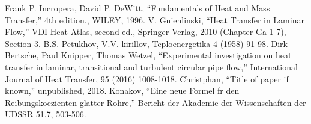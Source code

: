 \documentclass[conference]{IEEEtran}
\begin{document}
\begin{thebibliography}{00}
  Frank P. Incropera, David P. DeWitt, ``Fundamentals of Heat and Mass Transfer,'' 4th edition., WILEY, 1996.
  V. Gnienlinski, ``Heat Transfer in Laminar Flow,'' VDI Heat Atlas, second ed., Springer Verlag, 2010 (Chapter Ga 1-7), Section 3.
  B.S. Petukhov, V.V. kirillov, Teploenergetika 4 (1958) 91-98.
  Dirk Bertsche, Paul Knipper, Thomas Wetzel, ``Experimental investigation on heat transfer in laminar, transitional and turbulent circular pipe flow,'' International Journal of Heat Transfer, 95 (2016) 1008-1018.
 Christphan, ``Title of paper if known,'' unpublished, 2018.
 Konakov, ``Eine neue Formel fr den Reibungskoezienten glatter Rohre,'' Bericht der Akademie der Wissenschaften der UDSSR 51.7, 503-506.

%
%

\end{thebibliography}
\end{document}
